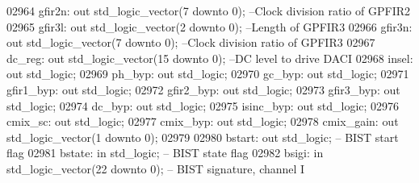 \begin{DoxyCode}
02964         gfir2n: \textcolor{keywordflow}{out} \textcolor{comment}{std\_logic\_vector}(\textcolor{vhdllogic}{}\textcolor{vhdllogic}{7} \textcolor{keywordflow}{downto} \textcolor{vhdllogic}{}\textcolor{vhdllogic}{0});       \textcolor{keyword}{--Clock division ratio of GPFIR2}
02965         gfir3l: \textcolor{keywordflow}{out} \textcolor{comment}{std\_logic\_vector}(\textcolor{vhdllogic}{}\textcolor{vhdllogic}{2} \textcolor{keywordflow}{downto} \textcolor{vhdllogic}{}\textcolor{vhdllogic}{0});       \textcolor{keyword}{--Length of GPFIR3}
02966         gfir3n: \textcolor{keywordflow}{out} \textcolor{comment}{std\_logic\_vector}(\textcolor{vhdllogic}{}\textcolor{vhdllogic}{7} \textcolor{keywordflow}{downto} \textcolor{vhdllogic}{}\textcolor{vhdllogic}{0});       \textcolor{keyword}{--Clock division ratio of GPFIR3}
02967         dc\_reg: \textcolor{keywordflow}{out} \textcolor{comment}{std\_logic\_vector}(\textcolor{vhdllogic}{}\textcolor{vhdllogic}{15} \textcolor{keywordflow}{downto} \textcolor{vhdllogic}{}\textcolor{vhdllogic}{0});  \textcolor{keyword}{--DC level to drive DACI}
02968         insel: \textcolor{keywordflow}{out} \textcolor{comment}{std\_logic};
02969         ph\_byp: \textcolor{keywordflow}{out} \textcolor{comment}{std\_logic};
02970         gc\_byp: \textcolor{keywordflow}{out} \textcolor{comment}{std\_logic};
02971         gfir1\_byp: \textcolor{keywordflow}{out} \textcolor{comment}{std\_logic};
02972         gfir2\_byp: \textcolor{keywordflow}{out} \textcolor{comment}{std\_logic};
02973         gfir3\_byp: \textcolor{keywordflow}{out} \textcolor{comment}{std\_logic};
02974         dc\_byp: \textcolor{keywordflow}{out} \textcolor{comment}{std\_logic};
02975         isinc\_byp: \textcolor{keywordflow}{out} \textcolor{comment}{std\_logic};
02976         cmix\_sc: \textcolor{keywordflow}{out} \textcolor{comment}{std\_logic};
02977         cmix\_byp: \textcolor{keywordflow}{out} \textcolor{comment}{std\_logic};
02978         cmix\_gain: \textcolor{keywordflow}{out} \textcolor{comment}{std\_logic\_vector}(\textcolor{vhdllogic}{}\textcolor{vhdllogic}{1} \textcolor{keywordflow}{downto} \textcolor{vhdllogic}{}\textcolor{vhdllogic}{0});
02979         
02980         bstart: \textcolor{keywordflow}{out} \textcolor{comment}{std\_logic};          \textcolor{keyword}{-- BIST start flag}
02981         bstate: \textcolor{keywordflow}{in} \textcolor{comment}{std\_logic};               \textcolor{keyword}{-- BIST state flag}
02982         bsigi: \textcolor{keywordflow}{in} \textcolor{comment}{std\_logic\_vector}(\textcolor{vhdllogic}{}\textcolor{vhdllogic}{22} \textcolor{keywordflow}{downto} \textcolor{vhdllogic}{}\textcolor{vhdllogic}{0});    \textcolor{keyword}{-- BIST signature, channel I}

\end{DoxyCode}
